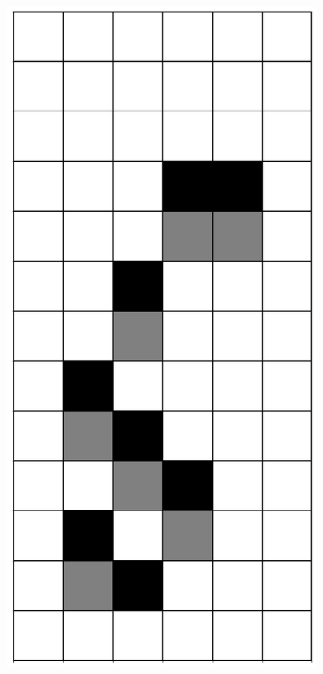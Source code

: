 \documentclass[12pt]{article}
\numberwithin{figure}{section} %
\begin{document}
\begin{figure}[H]
\begin{subfigure}{0.3\textwidth}
     		\includegraphics[angle=270,width=\linewidth]{Section4/11.0}
     		\subcaption{}
   	\end{subfigure}

\end{figure}
\end{document}
